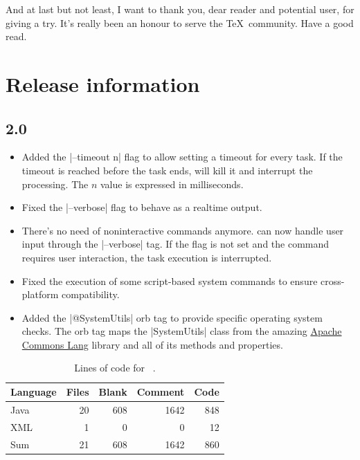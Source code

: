 \documentclass[a4paper,twoside,12pt]{memoir}
\begin{document}
And at last but not least, I want to thank you, dear reader and potential user, for giving \arara a try. It's really been an honour to serve the \TeX\ community. Have a good read.

\cleardoublepage

\section*{Release information}

\subsection*{2.0}
\begin{itemize}
\item[\featurenew] Added the |--timeout n| flag to allow setting a timeout for every task. If the timeout is reached before the task ends, \arara will kill it and interrupt the processing. The $n$ value is expressed in milliseconds.
\item[\featurefixed] Fixed the |--verbose| flag to behave as a realtime output.
\item[\featurenew] There's no need of noninteractive commands anymore. \arara can now handle user input through the |--verbose| tag. If the flag is not set and the command requires user interaction, the task execution is interrupted.
\item[\featurefixed] Fixed the execution of some script-based system commands to ensure cross-platform compatibility.
\item[\featurenew] Added the |@{SystemUtils}| orb tag to provide specific operating system checks. The orb tag maps the |SystemUtils| class from the amazing \href{http://commons.apache.org/lang/}{Apache Commons Lang} library and all of its methods and properties.
\end{itemize}

{\renewcommand{\arraystretch}{1.5}
\begin{table}[ht]
\centering
\begin{tabular}{lrrrr}
\hline
\textbf{Language} & \textbf{Files} & \textbf{Blank} & \textbf{Comment} & \textbf{Code}\\
\hline
\hline
Java & 20 & 608 & 1642 & 848\\
XML & 1 & 0 & 0 & 12\\
\hline
Sum & 21 & 608 & 1642 & 860\\
\hline
\end{tabular}
\caption{Lines of code for \arara\ .}
\label{tab:locarara20}
\end{table}}
\end{document}
